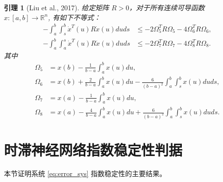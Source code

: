 \documentclass[a4paper, 12pt, oneside]{article}
\theoremstyle{cn_theorem}
\newtheorem{lemma}{引理}[section]   %
\begin{document}
\begin{lemma}[Liu et al., 2017]
给定矩阵 $R > 0$，对于所有连续可导函数 $x: [a,b] \to \mathbb{R}^n$, 有如下不等式：
\begin{align*}
    -\int_a^b \int_s^b \dot{x}^T(u) R \dot{x}(u) du ds &\le -2 \Omega_5^T R \Omega_5 - 4 \Omega_6^T R \Omega_6, \\
    -\int_a^b \int_a^s \dot{x}^T(u) R \dot{x}(u) du ds &\le -2 \Omega_7^T R \Omega_7 - 4 \Omega_8^T R \Omega_8.
\end{align*}
其中
\begin{align*}
    \Omega_5 &= x(b) - \frac{1}{b-a} \int_a^b x(u) du, \\
    \Omega_6 &= x(b) + \frac{2}{b-a} \int_a^b x(u) du - \frac{6}{(b-a)^2} \int_a^b \int_s^b x(u) du ds, \\
    \Omega_7 &= x(a) - \frac{1}{b-a} \int_a^b x(u) du, \\
    \Omega_8 &= x(a) - \frac{4}{b-a} \int_a^b x(u) du + \frac{6}{(b-a)^2} \int_a^b \int_s^b x(u) du ds.
\end{align*}
\end{lemma}

\section{时滞神经网络指数稳定性判据}
本节证明系统 \eqref{eq:error_sys} 指数稳定性的主要结果。
\end{document}
